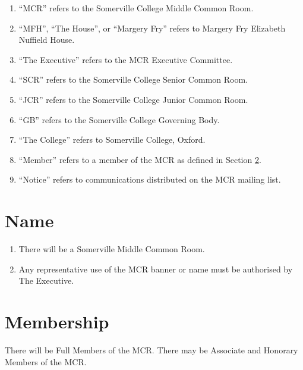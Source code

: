 \documentclass[11pt, a4paper]{article}
\begin{document}
\begin{enumerate}
	\item ``MCR'' refers to the Somerville College Middle Common Room.
    \item ``MFH'', ``The House'', or ``Margery Fry'' refers to Margery Fry Elizabeth Nuffield House.
    \item ``The Executive'' refers to the MCR Executive Committee.
	\item ``SCR'' refers to the Somerville College Senior Common Room.
	\item ``JCR'' refers to the Somerville College Junior Common Room.
	\item ``GB'' refers to the Somerville College Governing Body.
	\item ``The College'' refers to Somerville College, Oxford.
	\item ``Member'' refers to a member of the MCR as defined in Section \ref{sec:membership}.
    \item ``Notice'' refers to communications distributed on the MCR mailing list.
\end{enumerate}





\section{Name}
\label{sec:name}

\begin{enumerate}
	\item There will be a Somerville Middle Common Room.
    \item Any representative use of the MCR banner or name must be authorised by The Executive.
\end{enumerate}





\section{Membership}
\label{sec:membership}

There will be Full Members of the MCR.
There may be Associate and Honorary Members of the MCR.
\end{document}
